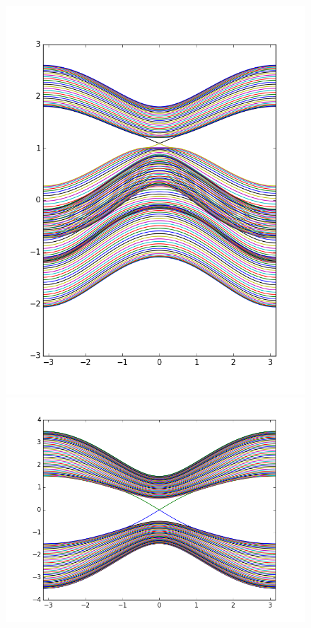 \begin{figure}[h]
    \centering
    \begin{minipage}[b]{0.4\textwidth}
        \includegraphics[width=\linewidth]{toy_ham_stripe.png}
    \end{minipage}
    \begin{minipage}[b]{0.4\textwidth}
        \includegraphics[width=\linewidth]{eff_ham_stripe.png}
    \end{minipage}
\end{figure}

